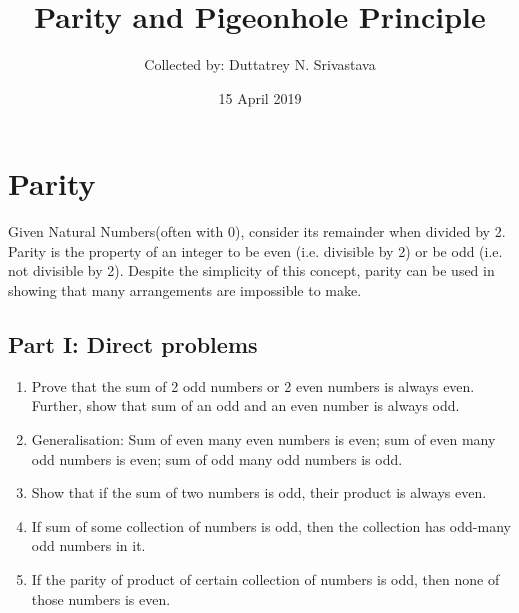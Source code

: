 \documentclass{amsart}
\begin{document}
\title{ Parity and Pigeonhole Principle}
\author{Collected by: Duttatrey N. Srivastava}


\date{15 April 2019}


\maketitle

\section{Parity}
 Given Natural Numbers(often with 0), consider its remainder when divided by 2. Parity is the property of an integer to be even (i.e. divisible by 2) or be odd (i.e. not divisible by 2). Despite the simplicity of this concept, parity can be used in showing that many arrangements are impossible to make.

\subsection{Part I: Direct problems}
\begin{enumerate}
\item Prove that the sum of 2 odd numbers or 2 even numbers is always even. Further, show that sum of an odd and an even number is always odd.
\item Generalisation: Sum of even many even numbers is even; sum of even many odd numbers is even; sum of odd many odd numbers is odd.
\item Show that if the sum of two numbers is odd, their product is always even.
\item If sum of some collection of numbers is odd, then the collection has odd-many odd numbers in it.
\item If the parity of product of certain collection of numbers is odd, then none of those numbers is even.
\end{enumerate}
\end{document}
